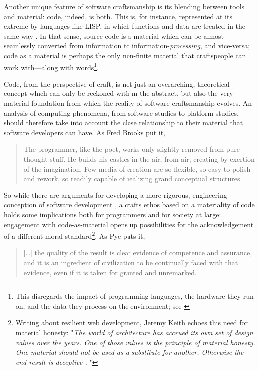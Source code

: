 Another unique feature of software craftsmanship is its blending between tools and material: code, indeed, is both. This is, for instance, represented at its extreme by languages like LISP, in which functions and data are treated in the same way \citep{mccarthy_lisp_1965}. In that sense, source code is a material which can be almost seamlessly converted from information to information-\emph{processing}, and vice-versa; code as a material is perhaps the only non-finite material that craftspeople can work with—along with words\footnote{This disregards the impact of programming languages, the hardware they run on, and the data they process on the environment; see \citep{kurp_green_2008}}.

Code, from the perspective of craft, is not just an overarching, theoretical concept which can only be reckoned with in the abstract, but also the very material foundation from which the reality of software craftsmanship evolves. An analysis of computing phenomena, from software studies to platform studies, should therefore take into account the close relationship to their material that software developers can have. As Fred Brooks put it,

\begin{quote}
    The programmer, like the poet, works only slightly removed from pure thought-stuff. He builds his castles in the air, from air, creating by exertion of the imagination. Few media of creation are so flexible, so easy to polish and rework, so readily capable of realizing grand conceptual structures. \citep{brooksjr_mythical_1975}
\end{quote}

So while there are arguments for developing a more rigorous, engineering conception of software development \citep{ensmenger_computer_2012}, a crafts ethos based on a materiality of code holds some implications both for programmers and for society at large: engagement with code-as-material opens up possibilities for the acknowledgement of a different moral standard\footnote{Writing about resilient web development, Jeremy Keith echoes this need for material honesty: "\emph{The world of architecture has accrued its own set of design values over the years. One of those values is the principle of material honesty. One material should not be used as a substitute for another. Otherwise the end result is deceptive \citep{keith_resilient_2016}. }"}. As Pye puts it,

\begin{quote}
    [\dots] the quality of the result is clear evidence of competence and assurance, and it is an ingredient of civilization to be continually faced with that evidence, even if it is taken for granted and unremarked. \citep{pye_nature_2008}
\end{quote}

